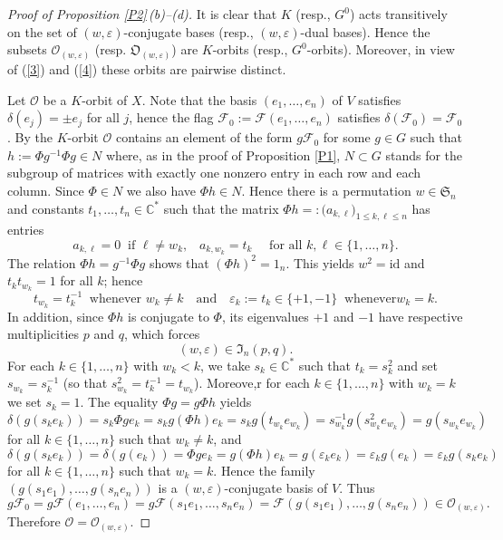 \documentclass{amsart}
\theoremstyle{definition}
\begin{document}
\begin{proof}[Proof of Proposition \ref{P2}\,{\rm (b)}--{\rm (d)}]
It is clear that $K$ (resp., $G^0$) acts transitively on the set of
$(w,\varepsilon)$-conjugate bases (resp., $(w,\varepsilon)$-dual
bases). Hence the subsets $\mathcal{O}_{(w,\varepsilon)}$ (resp.
$\mathfrak{O}_{(w,\varepsilon)}$) are $K$-orbits (resp.,
$G^0$-orbits). Moreover, in view of (\ref{3}) and (\ref{4}) these
orbits are pairwise distinct.

Let $\mathcal{O}$ be a $K$-orbit of $X$. Note that the basis $(e_1,\ldots,e_n)$ of
$V$ satisfies $\delta(e_j)=\pm
e_j$ for all $j$, hence the flag
$\mathcal{F}_0:=\mathcal{F}(e_1,\ldots,e_n)$ satisfies
$\delta(\mathcal{F}_0)=\mathcal{F}_0$. By
\cite{Richardson-Springer} the $K$-orbit $\mathcal{O}$ contains an
element of the form $g\mathcal{F}_0$ for some $g\in G$ such that
$h:=\Phi g^{-1}\Phi g\in N$ where, as in the proof of Proposition
\ref{P1}, $N\subset G$ stands for the subgroup of matrices with
exactly one nonzero entry in each row and each column. Since
$\Phi\in N$ we also have $\Phi h\in N$. Hence there is a permutation
$w\in\mathfrak{S}_n$ and constants
$t_1,\ldots,t_n\in\mathbb{C}^*$ such that the matrix $\Phi
h=:\big(a_{k,\ell}\big)_{1\leq k,\ell\leq n}$ has entries
\[a_{k,\ell}=0\ \mbox{ if $\ell\not=w_k$,}\quad a_{k,w_k}=t_k\quad\mbox{ for all $k,\ell\in\{1,\ldots,n\}$}.\]
The relation $\Phi h=g^{-1}\Phi g$ shows that $(\Phi h)^2=1_n$. This
yields $w^2=\mathrm{id}$ and $t_kt_{w_k}=1$ for all $k$; hence
\[t_{w_k}=t_k^{-1}\ \mbox{ whenever $w_k\not=k$}\quad\mbox{and}\quad \varepsilon_k:=t_k\in\{+1,-1\}\ \mbox{ whenever
$w_k=k$}.\] In addition, since $\Phi h$ is conjugate to $\Phi$, its
eigenvalues $+1$ and $-1$ have respective multiplicities $p$ and
$q$, which forces
\[(w,\varepsilon)\in\mathfrak{I}_n(p,q).\]
For each $k\in\{1,\ldots,n\}$ with $w_k<k$, we
take $s_k\in\mathbb{C}^*$ such that $t_k=s_k^2$ and set
$s_{w_k}=s_k^{-1}$ (so that $s_{w_k}^2=t_k^{-1}=t_{w_k}$). Moreove,r
for each $k\in\{1,\ldots,n\}$ with $w_k=k$ we set $s_k=1$. The
equality $\Phi g=g\Phi h$ yields
\[
\delta(g(s_ke_k))=s_k\Phi g e_k=s_k g(\Phi h)e_k=s_k
g(t_{w_k}e_{w_k})=s_{w_k}^{-1}
g(s_{w_k}^2e_{w_k})=g(s_{w_k}e_{w_k})
\]
for all $k\in\{1,\ldots,n\}$ such that $w_k\not=k$, and
\[
\delta(g(s_k e_k))=\delta(g(e_k))=\Phi g e_k=g(\Phi
h)e_k=g(\varepsilon_k e_k)=\varepsilon_k g(e_k)=\varepsilon_k g(s_k
e_k)
\]
for all $k\in\{1,\ldots,n\}$ such that $w_k=k$. Hence the family
$(g(s_1 e_1),\ldots,g(s_n e_n))$ is a $(w,\varepsilon)$-conjugate basis of
$V$. Thus
\[g\mathcal{F}_0=g\mathcal{F}(e_1,\ldots,e_n)=g\mathcal{F}(s_1 e_1,\ldots,s_n e_n)=\mathcal{F}(g(s_1 e_1),\ldots,g(s_n e_n))\in\mathcal{O}_{(w,\varepsilon)}.\]
Therefore $\mathcal{O}=\mathcal{O}_{(w,\varepsilon)}$.


\end{proof}
\end{document}
